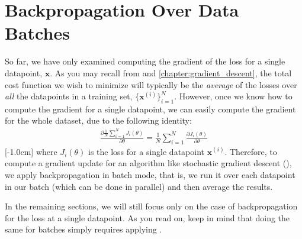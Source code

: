 \section{Backpropagation Over Data Batches}
So far, we have only examined computing the gradient of the loss for a single datapoint, $\mathbf{x}$. As you may recall from \chaps{\ref{chapter:intro_to_learning}} and \ref{chapter:gradient_descent}, the total cost function we wish to minimize will typically be the \textit{average} of the losses over \textit{all} the datapoints in a training set, $\{\mathbf{x}^{(i)}\}_{i=1}^N$. However, once we know how to compute the gradient for a single datapoint, we can easily compute the gradient for the whole dataset, due to the following identity:
\begin{align}
    \frac{\partial \frac{1}{N}\sum_{i=1}^N J_i(\theta)}{\partial \theta} = \frac{1}{N} \sum_{i=1}^N \frac{\partial J_i(\theta)}{\partial \theta}\label{eqn:backpropagation:average_of_gradients}
\end{align}
[-1.0cm]
where $J_i(\theta)$ is the loss for a single datapoint $\mathbf{x}^{(i)}$. Therefore, to compute a gradient update for an algorithm like stochastic gradient descent (\sect{\ref{sec:gradient_descent:SGD}}), we apply backpropagation in batch mode, that is, we run it over each datapoint in our batch (which can be done in parallel) and then average the results.

In the remaining sections, we will still focus only on the case of backpropagation for the loss at a single datapoint. As you read on, keep in mind that doing the same for batches simply requires applying \eqn{\ref{eqn:backpropagation:average_of_gradients}}.

